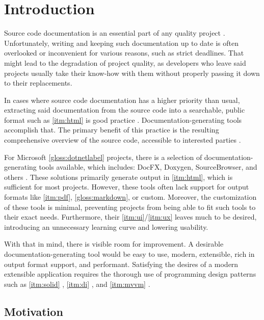 \chapter*{Introduction}

Source code documentation is an essential part of any quality project \cite{rachel_why_2018}. Unfortunately, writing and keeping such documentation up to date is often overlooked or inconvenient for various reasons, such as strict deadlines. That might lead to the degradation of project quality, as developers who leave said projects usually take their know-how with them without properly passing it down to their replacements.

In cases where source code documentation has a higher priority than usual, extracting said documentation from the source code into a searchable, public format such as \ref{itm:html} is good practice \cite{smrita_benefits_2014}. Documentation-generating tools accomplish that. The primary benefit of this practice is the resulting comprehensive overview of the source code, accessible to interested parties \cite{smrita_benefits_2014}.

For Microsoft \ref{gloss:dotnetlabel} projects, there is a selection of documentation-generating tools available, which includes: DocFX, Doxygen, SourceBrowser, and others \cite{wagner_xml_2022}. These solutions primarily generate output in \ref{itm:html}, which is sufficient for most projects. However, these tools often lack support for output formats like \ref{itm:pdf}, \ref{gloss:markdown}, or custom. Moreover, the customization of these tools is minimal, preventing projects from being able to fit such tools to their exact needs. Furthermore, their \ref{itm:ui}/\ref{itm:ux} leaves much to be desired, introducing an unnecessary learning curve and lowering usability.

With that in mind, there is visible room for improvement. A desirable documentation-generating tool would be easy to use, modern, extensible, rich in output format support, and performant. Satisfying the desires of a modern extensible application requires the thorough use of programming design patterns \cite{humblot_design_2021} such as \ref{itm:solid} \cite{hall_adaptive_2017}, \ref{itm:di} \cite{deursen_dependency_2019}, and \ref{itm:mvvm} \cite{katz_mvvm_2022}.

\section*{Motivation}

